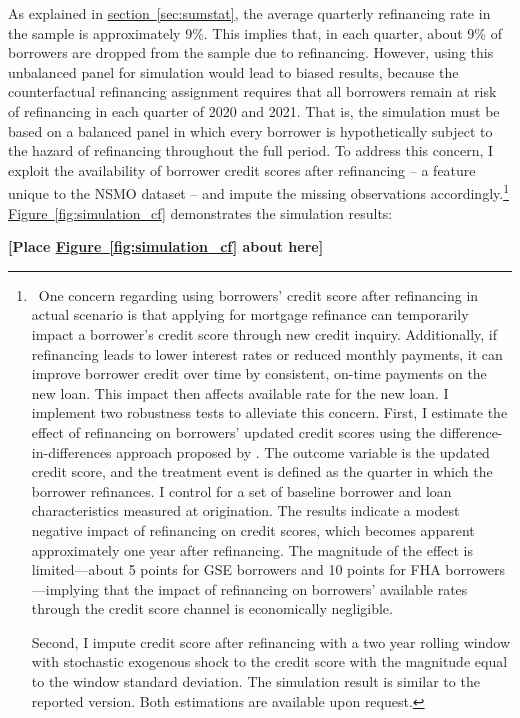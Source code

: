 \documentclass[11pt]{article}
\begin{document}
{As explained in \hyperref[sec:sumstat]{section~\ref{sec:sumstat}}, the average quarterly refinancing rate in the sample is approximately 9\%. This implies that, in each quarter, about 9\% of borrowers are dropped from the sample due to refinancing. However, using this unbalanced panel for simulation would lead to biased results, because the counterfactual refinancing assignment requires that all borrowers remain at risk of refinancing in each quarter of 2020 and 2021. That is, the simulation must be based on a balanced panel in which every borrower is hypothetically subject to the hazard of refinancing throughout the full period. To address this concern, I exploit the availability of borrower credit scores after refinancing -- a feature unique to the NSMO dataset --  and impute the missing observations accordingly.\footnote{~One concern regarding using borrowers' credit score after refinancing in actual scenario is that applying for mortgage refinance can temporarily impact a borrower’s credit score through new credit inquiry. Additionally, if refinancing leads to lower interest rates or reduced monthly payments, it can improve borrower credit over time by consistent, on-time payments on the new loan.  This impact then affects available rate for the new loan. I implement two robustness tests to alleviate this concern. First, I estimate the effect of refinancing on borrowers' updated credit scores using the difference-in-differences approach proposed by \citet{callaway2021difference}. The outcome variable is the updated credit score, and the treatment event is defined as the quarter in which the borrower refinances. I control for a set of baseline borrower and loan characteristics measured at origination. The results indicate a modest negative impact of refinancing on credit scores, which becomes apparent approximately one year after refinancing. The magnitude of the effect is limited—about 5 points for GSE borrowers and 10 points for FHA borrowers—implying that the impact of refinancing on borrowers' available rates through the credit score channel is economically negligible.

Second, I impute credit score after refinancing with a two year rolling window with stochastic exogenous shock to the credit score with the magnitude equal to the window standard deviation. The simulation result is similar to the reported version. Both estimations are available upon request.} \hyperref[fig:simulation_cf]{Figure~\ref*{fig:simulation_cf}} demonstrates the simulation results:


\bigskip
\centerline{\bf [Place \hyperref[fig:simulation_cf]{Figure~\ref*{fig:simulation_cf}} about here]}
\bigskip

}
\end{document}

